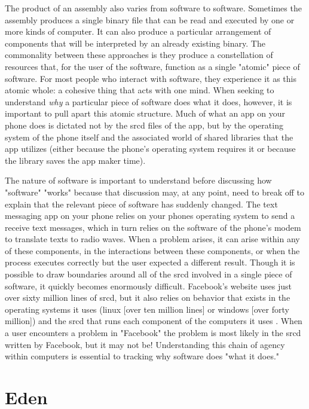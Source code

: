 \documentclass[a4paper,man,natbib]{apa6}
\begin{document}
   The product of an assembly also varies from software to software. Sometimes the assembly produces a single binary file that can be read and executed by one or more kinds of computer. It can also produce a particular arrangement of components that will be interpreted by an already existing binary. The commonality between these approaches is they produce a constellation of resources that, for the user of the software, function as a single "atomic" piece of software. For most people who interact with software, they experience it as this atomic whole: a cohesive thing that acts with one mind. When seeking to understand \textit{why} a particular piece of software does what it does, however, it is important to pull apart this atomic structure. Much of what an app on your phone does is dictated not by the \gls{srcd} files of the app, but by the operating system of the phone itself and the associated world of shared libraries that the app utilizes (either because the phone's operating system requires it or because the library saves the app maker time).

   The nature of software is important to understand before discussing how "software" "works" because that discussion may, at any point, need to break off to explain that the relevant piece of software has suddenly changed. The text messaging app on your phone relies on your phones operating system to send a receive text messages, which in turn relies on the software of the phone's modem to translate texts to radio waves. When a problem arises, it can arise within any of these components, in the interactions between these components, or when the process executes correctly but the user expected a different result. Though it is possible to draw boundaries around all of the \gls{srcd} involved in a single piece of software, it quickly becomes enormously difficult. Facebook's website uses just over sixty million lines of \gls{srcd}, but it also relies on behavior that exists in the operating systems it uses (linux [over ten million lines] or windows [over forty million]) and the \gls{srcd} that runs each component of the computers it uses \citep{McCandless2014-xd}. When a user encounters a problem in "Facebook" the problem is most likely in the \gls{srcd} written by Facebook, but it may not be! Understanding this chain of agency within computers is essential to tracking why software does "what it does."

   \section*{Eden}
\end{document}
